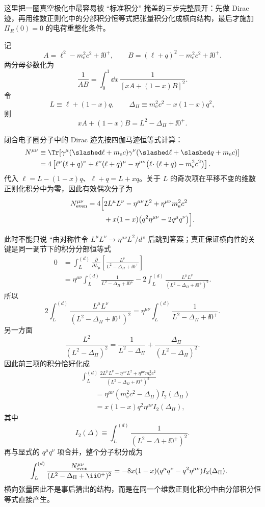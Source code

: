 \begin{derivation}
这里把一圈真空极化中最容易被 ``标准积分'' 掩盖的三步完整展开：先做 Dirac 迹，再用维数正则化中的分部积分恒等式把张量积分化成横向结构，最后才施加 $\Pi_R(0)=0$ 的电荷重整化条件。

记
\[
 A=\ell^2-m_{\mathrm e}^2c^2+\ii0^+,
 \qquad
 B=(\ell+q)^2-m_{\mathrm e}^2c^2+\ii0^+ .
\]
两分母参数化为
\[
 \frac1{AB}=\int_0^1\dd x\,
 \frac1{[xA+(1-x)B]^2}.
\]
令
\[
 L\equiv \ell+(1-x)q,
 \qquad
 \Delta_\Pi\equiv m_{\mathrm e}^2c^2-x(1-x)q^2,
\]
则
\[
 xA+(1-x)B=L^2-\Delta_\Pi+\ii0^+.
\]

闭合电子圈分子中的 Dirac 迹先按四伽马迹恒等式计算：
\begin{align*}
N^{\mu\nu}
&\equiv
\Tr\!\left[
\gamma^\mu(\slashed\ell+m_{\mathrm e} c)
\gamma^\nu(\slashed\ell+\slashed q+m_{\mathrm e} c)
\right]\\
&=4\left[
\ell^\mu(\ell+q)^\nu
+\ell^\nu(\ell+q)^\mu
-\eta^{\mu\nu}
\bigl(\ell\!\cdot(\ell+q)-m_{\mathrm e}^2c^2\bigr)
\right].
\end{align*}
代入
$\ell=L-(1-x)q$、$\ell+q=L+xq$。关于 $L$ 的奇次项在平移不变的维数正则化积分中为零，因此有效偶次分子为
\begin{align*}
N_{\rm even}^{\mu\nu}
=4\Bigl[
&2L^\mu L^\nu-\eta^{\mu\nu}L^2
+\eta^{\mu\nu}m_{\mathrm e}^2c^2\\
&+x(1-x)
\bigl(q^2\eta^{\mu\nu}-2q^\mu q^\nu\bigr)
\Bigr].
\end{align*}

此时不能只说 ``由对称性令 $L^\mu L^\nu\to\eta^{\mu\nu}L^2/d$'' 后跳到答案；真正保证横向性的关键是同一调节下的积分分部恒等式
\begin{align*}
0
&=\int_L^{(d)}
\frac{\partial}{\partial L_\mu}
\left[
\frac{L^\nu}{L^2-\Delta_\Pi+\ii0^+}
\right]\\
&=\eta^{\mu\nu}
\int_L^{(d)}\frac1{L^2-\Delta_\Pi+\ii0^+}
-2\int_L^{(d)}
\frac{L^\mu L^\nu}
{(L^2-\Delta_\Pi+\ii0^+)^2}.
\end{align*}
所以
\[
2\int_L^{(d)}
\frac{L^\mu L^\nu}{(L^2-\Delta_\Pi+\ii0^+)^2}
=\eta^{\mu\nu}
\int_L^{(d)}\frac1{L^2-\Delta_\Pi+\ii0^+}.
\]
另一方面
\[
\frac{L^2}{(L^2-\Delta_\Pi)^2}
=\frac1{L^2-\Delta_\Pi}
+\frac{\Delta_\Pi}{(L^2-\Delta_\Pi)^2}.
\]
因此前三项的积分恰好化成
\begin{align*}
&\int_L^{(d)}
\frac{2L^\mu L^\nu-\eta^{\mu\nu}L^2
+\eta^{\mu\nu}m_{\mathrm e}^2c^2}
{(L^2-\Delta_\Pi+\ii0^+)^2}\\
&\qquad
=\eta^{\mu\nu}
(m_{\mathrm e}^2c^2-\Delta_\Pi)
I_2(\Delta_\Pi)\\
&\qquad
=x(1-x)q^2\eta^{\mu\nu}I_2(\Delta_\Pi),
\end{align*}
其中
\[
I_2(\Delta)
\equiv
\int_L^{(d)}\frac1{(L^2-\Delta+\ii0^+)^2}.
\]
再与显式的 $q^\mu q^\nu$ 项合并，整个分子积分成为
\begin{align*}
\int_L^{(d)}
\frac{N_{\rm even}^{\mu\nu}}
{(L^2-\Delta_\Pi+\ii0^+)^2}
&=-8x(1-x)
(q^\mu q^\nu-q^2\eta^{\mu\nu})
I_2(\Delta_\Pi).
\end{align*}
横向张量因此不是事后猜出的结构，而是在同一个维数正则化积分中由分部积分恒等式直接产生。


\end{derivation}
